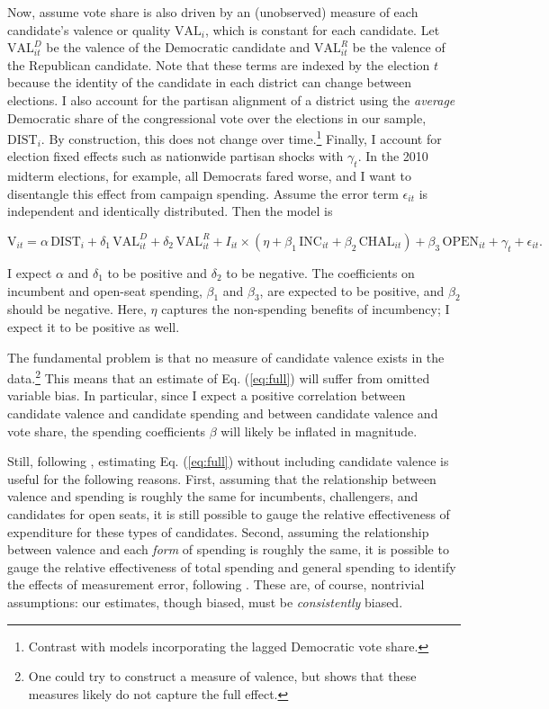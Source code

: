 \documentclass{article}
\begin{document}
Now, assume vote share is also driven by an (unobserved) measure of each candidate's valence or quality $\text{VAL}_{i}$, which is constant for each candidate. Let $\text{VAL}^D_{it}$ be the valence of the Democratic candidate and $\text{VAL}^R_{it}$ be the valence of the Republican candidate. Note that these terms are indexed by the election $t$ because the identity of the candidate in each district can change between elections. I also account for the partisan alignment of a district using the \textit{average} Democratic share of the congressional vote over the elections in our sample, $\text{DIST}_{i}$. By construction, this does not change over time.\footnote{Contrast with models incorporating the lagged Democratic vote share.} Finally, I account for election fixed effects such as nationwide partisan shocks with $\gamma_t$. In the 2010 midterm elections, for example, all Democrats fared worse, and I want to disentangle this effect from campaign spending. Assume the error term $\epsilon_{it}$ is independent and identically distributed. Then the model is

\begin{equation}
\text{V}_{it} = \alpha \, \text{DIST}_i + \delta_1 \, \text{VAL}^{D}_{it} + \delta_2 \, \text{VAL}^{R}_{it} + I_{it} \times (\eta + \beta_1 \, \text{INC}_{it} + \beta_2 \, \text{CHAL}_{it}) + \beta_3 \, \text{OPEN}_{it} + \gamma_t + \epsilon_{it}.
\label{eq:full}
\end{equation}

I expect $\alpha$ and $\delta_1$ to be positive and $\delta_2$ to be negative. The coefficients on incumbent and open-seat spending, $\beta_1$ and $\beta_3$, are expected to be positive, and $\beta_2$ should be negative. Here, $\eta$ captures the non-spending benefits of incumbency; I expect it to be positive as well.

The fundamental problem is that no measure of candidate valence exists in the data.\footnote{One could try to construct a measure of valence, but \cite{levitt-1994} shows that these measures likely do not capture the full effect.} This means that an estimate of Eq. (\ref{eq:full}) will suffer from omitted variable bias. In particular, since I expect a positive correlation between candidate valence and candidate spending and between candidate valence and vote share, the spending coefficients $\beta$ will likely be inflated in magnitude.

Still, following \cite{jacobson-1978}, estimating Eq. (\ref{eq:full}) without including candidate valence is useful for the following reasons. First, assuming that the relationship between valence and spending is roughly the same for incumbents, challengers, and candidates for open seats, it is still possible to gauge the relative effectiveness of expenditure for these types of candidates. Second, assuming the relationship between valence and each \textit{form} of spending is roughly the same, it is possible to gauge the relative effectiveness of total spending and general spending to identify the effects of measurement error, following \cite{ansolabehere1994mismeasure}. These are, of course, nontrivial assumptions: our estimates, though biased, must be \textit{consistently} biased.
\end{document}
